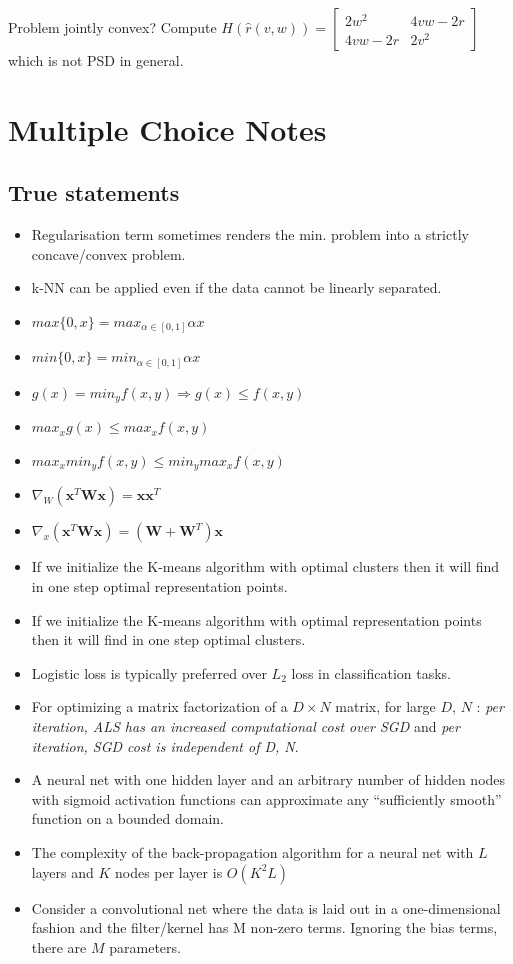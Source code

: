 Problem jointly convex? Compute $H(\hat{r}({v,w})) = \begin{bmatrix} 2w^2 & 4vw-2r \\ 4vw-2r & 2v^2 \end{bmatrix}$ which is not PSD in general.


\section{Multiple Choice Notes}
\subsection{True statements}
\begin{itemize}
\item Regularisation term sometimes renders the min. problem into a strictly concave/convex problem.
\item k-NN can be applied even if the data cannot be linearly separated.
\item $max\{ 0, x\} = max_{\alpha \in [0,1]} \alpha x$
\item $min\{ 0, x\} = min_{\alpha \in [0,1]} \alpha x$
\item $g(x) = min_y f(x,y) \Rightarrow g(x) \le f(x,y)$
\item $max_x g(x) \le max_x f(x,y)$
\item $max_x min_y f(x,y) \le min_y max_x f(x,y)$
\item $\nabla_{W} (\mathbf{x}^T\mathbf{W}\mathbf{x}) = \mathbf{x}\mathbf{x}^T$
\item $\nabla_{x} (\mathbf{x}^T\mathbf{W}\mathbf{x}) = (\mathbf{W}+\mathbf{W}^T)\mathbf{x}$
\item If we initialize the K-means algorithm with optimal clusters then it will find in one step optimal representation points.
\item If we initialize the K-means algorithm with optimal representation points then it will find in one step optimal clusters.
\item Logistic loss is typically preferred over $L_2$ loss in classification tasks.
\item For optimizing a matrix factorization of a $D\times N$ matrix, for large $D$, $N$ : \textit{per iteration, ALS has an increased computational cost over SGD} and \textit{per iteration, SGD cost is independent of D, N}.
\item A neural net with one hidden layer and an arbitrary number of hidden nodes with sigmoid activation functions can approximate any “sufficiently smooth” function on a bounded domain.
\item The complexity of the back-propagation algorithm for a neural net with $L$ layers and $K$ nodes per layer is $O(K^2L)$
\item Consider a convolutional net where the data is laid out in a one-dimensional fashion and the filter/kernel has M non-zero terms. Ignoring the bias terms, there are $M$ parameters.
\end{itemize}

